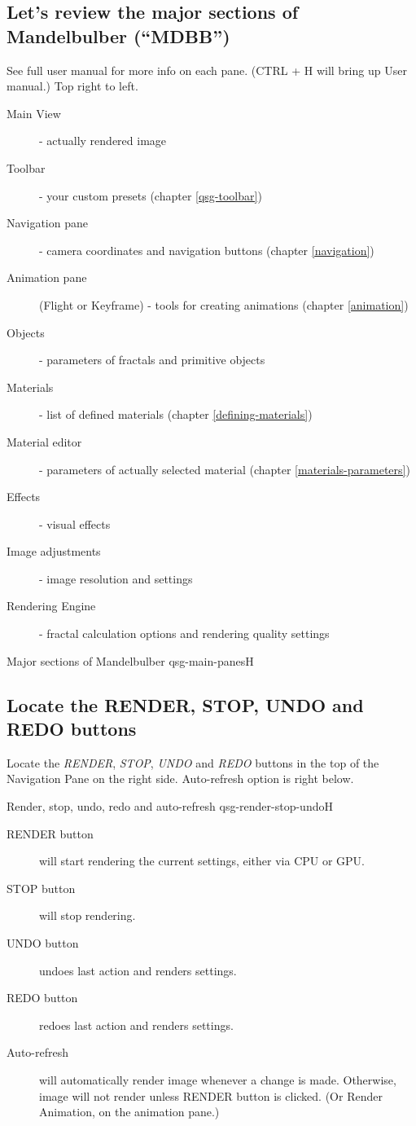 \subsection{Let’s review the major sections of Mandelbulber (“MDBB”)}\label{qsg-major-sections}

See full user manual for more info on each pane. (CTRL + H will bring up User manual.) Top right to left. 
\begin{description}
   	\item [Main View] - actually rendered image
  	\item [Toolbar] - your custom presets (chapter \ref{qsg-toolbar})
  	\item [Navigation pane] - camera coordinates and navigation buttons (chapter \ref{navigation})
  	\item [Animation pane] (Flight or Keyframe) - tools for creating animations (chapter \ref{animation})
  	\item [Objects] - parameters of fractals and primitive objects
  	\item [Materials] - list of defined materials (chapter \ref{defining-materials})
  	\item [Material editor] - parameters of actually selected material (chapter \ref{materials-parameters})
  	\item [Effects] - visual effects
  	\item [Image adjustments] - image resolution and settings
  	\item [Rendering Engine] - fractal calculation options and rendering quality settings
\end{description}

{Major sections of Mandelbulber}
{qsg-main-panes}{H}


\subsection{Locate the RENDER, STOP, UNDO and REDO buttons}\label{qsg-render-button}
Locate the \emph{RENDER}, \emph{STOP}, \emph{UNDO} and \emph{REDO} buttons in the top of the Navigation Pane on the right side. Auto-refresh option is right below.

{Render, stop, undo, redo and auto-refresh}
{qsg-render-stop-undo}{H}

\begin{description}
	\item[RENDER button] will start rendering the current settings, either via CPU or GPU.
	\item[STOP button] will stop rendering.
	\item[UNDO button] undoes last action and renders settings.
	\item[REDO button] redoes last action and renders settings.
	\item[Auto-refresh] will automatically render image whenever a change is made. Otherwise, image will not render unless RENDER button is clicked. (Or Render Animation, on the animation pane.)

\end{description}

